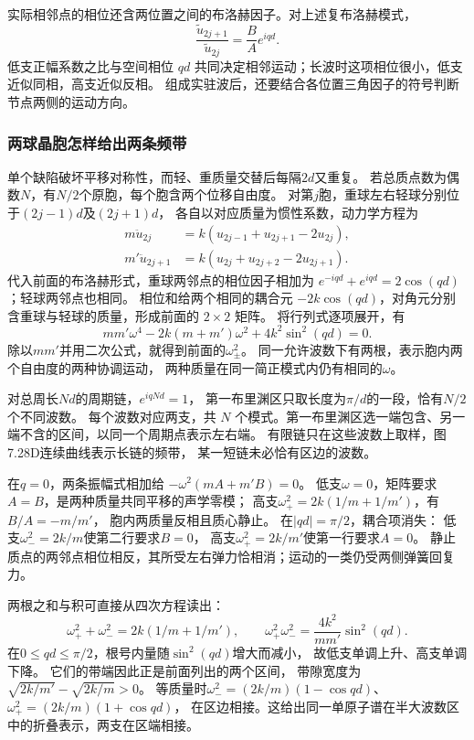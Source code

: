 \documentclass[UTF8,fontset=fandol,a4paper,11pt]{ctexart}
\begin{document}
实际相邻点的相位还含两位置之间的布洛赫因子。对上述复布洛赫模式，
\[
\frac{\widetilde u_{2j+1}}{\widetilde u_{2j}}=\frac BA e^{iqd}.
\]
低支正幅系数之比与空间相位 $qd$ 共同决定相邻运动；长波时这项相位很小，低支近似同相，高支近似反相。
组成实驻波后，还要结合各位置三角因子的符号判断节点两侧的运动方向。

\subsubsection*{两球晶胞怎样给出两条频带}
单个缺陷破坏平移对称性，而轻、重质量交替后每隔$2d$又重复。
若总质点数为偶数$N$，有$N/2$个原胞，每个胞含两个位移自由度。
对第$j$胞，重球左右轻球分别位于$(2j-1)d$及$(2j+1)d$，
各自以对应质量为惯性系数，动力学方程为
\[
\begin{aligned}
m\ddot u_{2j}&=k(u_{2j-1}+u_{2j+1}-2u_{2j}),\\
m'\ddot u_{2j+1}&=k(u_{2j}+u_{2j+2}-2u_{2j+1}).
\end{aligned}
\]
代入前面的布洛赫形式，重球两邻点的相位因子相加为
$e^{-iqd}+e^{iqd}=2\cos(qd)$；轻球两邻点也相同。
相位和给两个相同的耦合元 $-2k\cos(qd)$，对角元分别含重球与轻球的质量，形成前面的 $2\times2$ 矩阵。
将行列式逐项展开，有
\[
mm'\omega^4-2k(m+m')\omega^2+4k^2\sin^2(qd)=0.
\]
除以$mm'$并用二次公式，就得到前面的$\omega_\pm^2$。
同一允许波数下有两根，表示胞内两个自由度的两种协调运动，
两种质量在同一简正模式内仍有相同的$\omega$。

对总周长$Nd$的周期链，$e^{iqNd}=1$，
第一布里渊区只取长度为$\pi/d$的一段，恰有$N/2$个不同波数。
每个波数对应两支，共 $N$ 个模式。第一布里渊区选一端包含、另一端不含的区间，以同一个周期点表示左右端。
有限链只在这些波数上取样，图7.28D连续曲线表示长链的频带，
某一短链未必恰有区边的波数。

在$q=0$，两条振幅式相加给
$-\omega^2(mA+m'B)=0$。
低支$\omega=0$，矩阵要求$A=B$，是两种质量共同平移的声学零模；
高支$\omega_+^2=2k(1/m+1/m')$，有$B/A=-m/m'$，
胞内两质量反相且质心静止。
在$|qd|=\pi/2$，耦合项消失：
低支$\omega_-^2=2k/m$使第二行要求$B=0$，
高支$\omega_+^2=2k/m'$使第一行要求$A=0$。
静止质点的两邻点相位相反，其所受左右弹力恰相消；运动的一类仍受两侧弹簧回复力。

两根之和与积可直接从四次方程读出：
\[
\omega_+^2+\omega_-^2=2k(1/m+1/m'),\qquad
\omega_+^2\omega_-^2=\frac{4k^2}{mm'}\sin^2(qd).
\]
在$0\le qd\le\pi/2$，根号内量随$\sin^2(qd)$增大而减小，
故低支单调上升、高支单调下降。
它们的带端因此正是前面列出的两个区间，
带隙宽度为$\sqrt{2k/m'}-\sqrt{2k/m}>0$。
等质量时$
\omega_-^2=(2k/m)(1-\cos qd)$、
$\omega_+^2=(2k/m)(1+\cos qd)$，
在区边相接。这给出同一单原子谱在半大波数区中的折叠表示，两支在区端相接。
\end{document}
